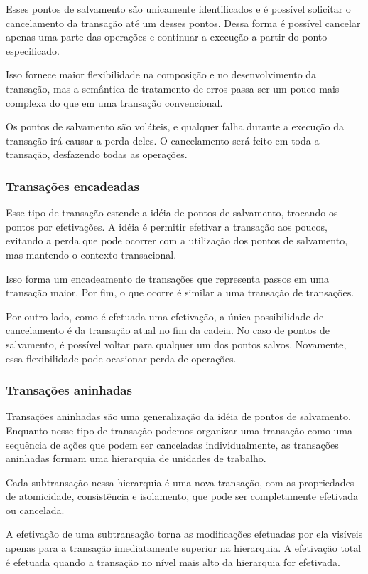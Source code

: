 \documentclass[11pt,twoside,a4paper]{book}
\begin{document}
Esses pontos de salvamento são unicamente identificados e é possível solicitar o cancelamento da transação até um desses pontos. Dessa forma é possível cancelar apenas uma parte das operações e continuar a execução a partir do ponto especificado.

Isso fornece maior flexibilidade na composição e no desenvolvimento da transação, mas a semântica de tratamento de erros passa ser um pouco mais complexa do que em uma transação convencional.

Os pontos de salvamento são voláteis, e qualquer falha durante a execução da transação irá causar a perda deles. O cancelamento será feito em toda a transação, desfazendo todas as operações.

\subsubsection*{Transações encadeadas}
Esse tipo de transação estende a idéia de pontos de salvamento, trocando os pontos por efetivações. A idéia é permitir efetivar a transação aos poucos, evitando a perda que pode ocorrer com a utilização dos pontos de salvamento, mas mantendo o contexto transacional.

Isso forma um encadeamento de transações que representa passos em uma transação maior. Por fim, o que ocorre é similar a uma transação de transações.

Por outro lado, como é efetuada uma efetivação, a única possibilidade de cancelamento é da transação atual no fim da cadeia. No caso de pontos de salvamento, é possível voltar para qualquer um dos pontos salvos. Novamente, essa flexibilidade pode ocasionar perda de operações.

\subsubsection*{Transações aninhadas}
Transações aninhadas são uma generalização da idéia de pontos de salvamento. Enquanto nesse tipo de transação podemos organizar uma transação como uma sequência de ações que podem ser canceladas individualmente, as transações aninhadas formam uma hierarquia de unidades de trabalho.

Cada subtransação nessa hierarquia é uma nova transação, com as propriedades de atomicidade, consistência e isolamento, que pode ser completamente efetivada ou cancelada. 

A efetivação de uma subtransação torna as modificações efetuadas por ela visíveis apenas para a transação imediatamente superior na hierarquia. A efetivação total é efetuada quando a transação no nível mais alto da hierarquia for efetivada.
\end{document}

